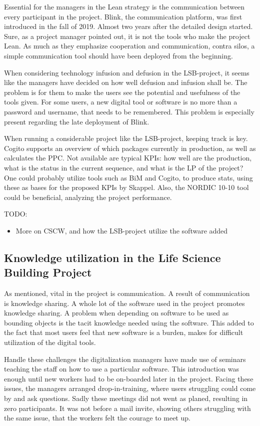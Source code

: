 Essential for the managers in the Lean strategy is the communication between every participant in the project. Blink, the communication platform, was first introduced in the fall of 2019. Almost two years after the detailed design started. Sure, as a project manager pointed out, it is not the tools who make the project Lean. As much as they emphasize cooperation and communication, contra silos, a simple communication tool should have been deployed from the beginning.

When considering technology infusion and defusion in the LSB-project, it seems like the managers have decided on how well defusion and infusion shall be. The problem is for them to make the users see the potential and usefulness of the tools given. For some users, a new digital tool or software is no more than a password and username, that needs to be remembered. This problem is especially present regarding the late deployment of Blink. 

When running a considerable project like the LSB-project, keeping track is key. Cogito supports an overview of which packages currently in production, as well as calculates the PPC. Not available are typical KPIs: how well are the production, what is the status in the current sequence, and what is the LP of the project? One could probably utilize tools such as BiM and Cogito, to produce stats, using these as bases for the proposed KPIs by Skappel. Also, the NORDIC 10-10 tool could be beneficial, analyzing the project performance. 

TODO: 
\begin{itemize}
    \item More on CSCW, and how the LSB-project utilize the software added
\end{itemize}


\subsection{Knowledge utilization in the Life Science Building Project}
As mentioned, vital in the project is communication. A result of communication is knowledge sharing. A whole lot of the software used in the project promotes knowledge sharing. A problem when depending on software to be used as bounding objects is the tacit knowledge needed using the software. This added to the fact that most users feel that new software is a burden, makes for difficult utilization of the digital tools.   

Handle these challenges the digitalization managers have made use of seminars teaching the staff on how to use a particular software. This introduction was enough until new workers had to be on-boarded later in the project. Facing these issues, the managers arranged drop-in-training, where users struggling could come by and ask questions. Sadly these meetings did not went as planed, resulting in zero participants. It was not before a mail invite, showing others struggling with the same issue, that the workers felt the courage to meet up. 

